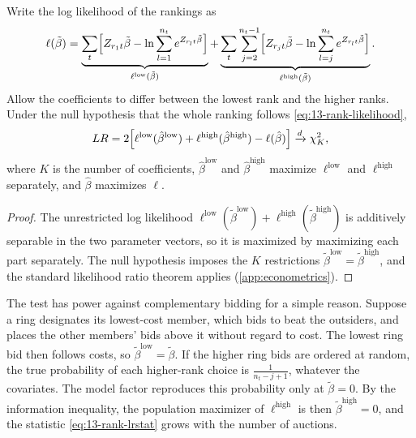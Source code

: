 \begin{corollary}\label{cor:13-rank-lr}
Write the log likelihood of the rankings as
\begin{equation}\label{eq:13-rank-loglik}
  \ell(\tilde\beta) = \underbrace{\sum_{t}\Bigl[Z_{r_1 t}\tilde\beta - \ln\sum_{l=1}^{n_t}e^{Z_{r_l t}\tilde\beta}\Bigr]}_{\ell^{\mathrm{low}}(\tilde\beta)}
  + \underbrace{\sum_{t}\sum_{j=2}^{n_t - 1}\Bigl[Z_{r_j t}\tilde\beta - \ln\sum_{l=j}^{n_t}e^{Z_{r_l t}\tilde\beta}\Bigr]}_{\ell^{\mathrm{high}}(\tilde\beta)} .
\end{equation}
Allow the coefficients to differ between the lowest rank and the higher ranks. Under the null hypothesis that the
whole ranking follows \eqref{eq:13-rank-likelihood},
\begin{equation}\label{eq:13-rank-lrstat}
  LR = 2\Bigl[\ell^{\mathrm{low}}(\hat\beta^{\mathrm{low}}) + \ell^{\mathrm{high}}(\hat\beta^{\mathrm{high}}) - \ell(\hat\beta)\Bigr]
  \xrightarrow{d} \chi^2_K ,
\end{equation}
where $K$ is the number of coefficients, $\hat\beta^{\mathrm{low}}$ and $\hat\beta^{\mathrm{high}}$ maximize
$\ell^{\mathrm{low}}$ and $\ell^{\mathrm{high}}$ separately, and $\hat\beta$ maximizes $\ell$.
\end{corollary}

\begin{proof}
The unrestricted log likelihood $\ell^{\mathrm{low}}(\tilde\beta^{\mathrm{low}}) + \ell^{\mathrm{high}}(\tilde\beta^{\mathrm{high}})$ is
additively separable in the two parameter vectors, so it is maximized by maximizing each part separately. The null
hypothesis imposes the $K$ restrictions $\tilde\beta^{\mathrm{low}} = \tilde\beta^{\mathrm{high}}$, and the standard
likelihood ratio theorem applies (\cref{app:econometrics}).
\end{proof}

The test has power against complementary bidding for a simple reason. Suppose a ring designates its lowest-cost
member, which bids to beat the outsiders, and places the other members' bids above it without regard to cost. The
lowest ring bid then follows costs, so $\tilde\beta^{\mathrm{low}} = \tilde\beta$. If the higher ring bids are
ordered at random, the true probability of each higher-rank choice is $\frac{1}{n_t - j + 1}$, whatever the
covariates. The model factor reproduces this probability only at $\tilde\beta = 0$. By the information inequality,
the population maximizer of $\ell^{\mathrm{high}}$ is then $\tilde\beta^{\mathrm{high}} = 0$, and the statistic
\eqref{eq:13-rank-lrstat} grows with the number of auctions.

